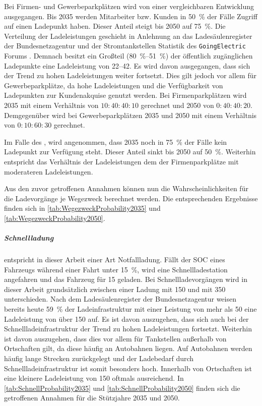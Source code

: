 Bei Firmen- und Gewerbeparkplätzen wird von einer vergleichbaren Entwicklung ausgegangen.
Bis \num{2035} werden Mitarbeiter bzw. Kunden in \SI{50}{\percent} der Fälle Zugriff auf einen Ladepunkt haben.
Dieser Anteil steigt bis \num{2050} auf \SI{75}{\percent}.
Die Verteilung der Ladeleistungen geschieht in Anlehnung an das Ladesäulenregister der Bundesnetzagentur \cite[][Stand: ]{BundesnetzagenturElektrizitaet2020} und der Stromtankstellen Statistik des \texttt{GoingElectric} Forums \cite[][Stand: ]{Weemaes2020}.
Demnach besitzt ein Großteil (\SIrange[range-phrase=~bzw.~]{80}{51}{\percent}) der öffentlich zugänglichen Ladepunkte eine Ladeleistung von \SIrange{22}{42}{\kw}.
Es wird davon ausgegangen, dass sich der Trend zu hohen Ladeleistungen weiter fortsetzt.
Dies gilt jedoch vor allem für Gewerbeparkplätze, da hohe Ladeleistungen und die Verfügbarkeit von Ladepunkten zur Kundenakquise genutzt werden.
Bei Firmenparkplätzen wird \num{2035} mit einem Verhältnis von \(10:40:40:10\) gerechnet und \num{2050} von \(0:40:40:20\).
Demgegenüber wird bei Gewerbeparkplätzen \num{2035} und \num{2050} mit einem Verhältnis von \(0:10:60:30\) gerechnet.\medskip

Im Falle des \UCs \Straszenranddot, wird angenommen, dass \num{2035} noch in \SI{75}{\percent} der Fälle kein Ladepunkt zur Verfügung steht.
Dieser Anteil sinkt bis \num{2050} auf \SI{50}{\percent}.
Weiterhin entspricht das Verhältnis der Ladeleistungen dem der Firmenparkplätze mit moderateren Ladeleistungen.\medskip

Aus den zuvor getroffenen Annahmen können nun die Wahrscheinlichkeiten für die Ladevorgänge je Wegezweck berechnet werden.
Die entsprechenden Ergebnisse finden sich in \autoref{tab:WegezweckProbability2035} und \autoref{tab:WegezweckProbability2050}.



\subparagraph{Schnellladung} entspricht in dieser Arbeit einer Art Notfallladung.
Fällt der \gls{SOC} eines Fahrzeugs während einer Fahrt unter \SI{15}{\percent}, wird eine Schnellladestation angefahren und das Fahrzeug für \SI{15}{\Minuten} geladen.
Bei Schnellladevorgängen wird in dieser Arbeit grundsätzlich zwischen einer Ladung mit \SI{150}{\kw} und mit \SI{350}{\kw} unterschieden.
Nach dem Ladesäulenregister der Bundesnetzagentur \cite[][Stand: ]{BundesnetzagenturElektrizitaet2020} weisen bereits heute \SI{59}{\percent} der Ladeinfrastruktur mit einer Leistung von mehr als \SI{50}{\kw} eine Ladeleistung von über \SI{150}{\kw} auf.
Es ist davon auszugehen, dass sich auch bei der Schnellladeinfrastruktur der Trend zu hohen Ladeleistungen fortsetzt.
Weiterhin ist davon auszugehen, dass dies vor allem für Tankstellen außerhalb von Ortschaften gilt, da diese häufig an Autobahnen liegen.
Auf Autobahnen werden häufig lange Strecken zurückgelegt und der Ladebedarf durch Schnellladeinfrastruktur ist somit besonders hoch.
Innerhalb von Ortschaften ist eine kleinere Ladeleistung von \SI{150}{\kw} oftmals ausreichend.
In \autoref{tab:SchnellProbability2035} und \autoref{tab:SchnellProbability2050} finden sich die getroffenen Annahmen für die Stützjahre \num{2035} und \num{2050}.

